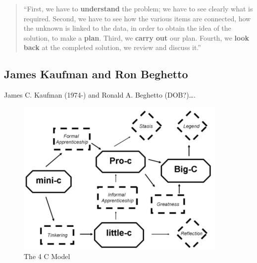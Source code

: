 \begin{quotation}
  ``First, we have to \textbf{understand} the problem; we have to see clearly what is required. Second, we have to see how the various items are connected, how the unknown is linked to the data, in order to obtain the idea of the solution, to make a \textbf{plan}. Third, we \textbf{carry out} our plan. Fourth, we \textbf{look back} at the completed solution, we review and discuss it.'' 
\end{quotation}


\subsection*{James Kaufman and Ron Beghetto}

James C. Kaufman (1974-) and Ronald A. Beghetto (DOB?)\ldots\autocite[See][]{Kaufman2009}.

\begin{figure}[htb] %
  \centering
  \includegraphics[width=\linewidth]{images/4C.png}
\caption[The 4 C Model]{The 4 C Model}
\label{fig:4C}
\end{figure}



